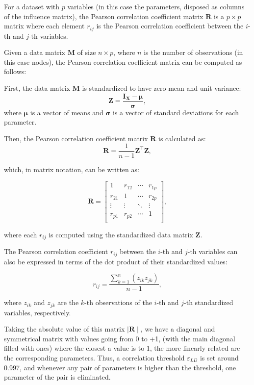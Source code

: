 For a dataset with \( p \) variables (in this case the parameters, disposed as columns of the influence matrix), the Pearson correlation coefficient matrix \( \mathbf{R} \) is a \( p \times p \) matrix where each element \( r_{ij} \) is the Pearson correlation coefficient between the \( i \)-th and \( j \)-th variables.

Given a data matrix \( \mathbf{M} \) of size \( n \times p \), where \( n \) is the number of observations (in this case nodes), the Pearson correlation coefficient matrix can be computed as follows:

First, the data matrix \( \mathbf{M} \) is standardized to have zero mean and unit variance:
   \[
   \mathbf{Z} = \frac{\boldsymbol{I_X} - \mathbf{\mu}}{\mathbf{\sigma}},
   \]
where \( \mathbf{\mu} \) is a vector of means and \( \mathbf{\sigma} \) is a vector of standard deviations for each parameter.

Then, the Pearson correlation coefficient matrix \( \mathbf{R} \) is calculated as:
   \[
   \mathbf{R} = \frac{1}{n-1} \mathbf{Z}^\top \mathbf{Z}, 
   \]

which, in matrix notation, can be written as:

\[
\mathbf{R} = \left[ \begin{array}{cccc}
1 & r_{12} & \cdots & r_{1p} \\
r_{21} & 1 & \cdots & r_{2p} \\
\vdots & \vdots & \ddots & \vdots \\
r_{p1} & r_{p2} & \cdots & 1 \\
\end{array} \right],
\]

where each \( r_{ij} \) is computed using the standardized data matrix \( \mathbf{Z} \).

The Pearson correlation coefficient \( r_{ij} \) between the \( i \)-th and \( j \)-th variables can also be expressed in terms of the dot product of their standardized values:

\[
r_{ij} = \frac{\sum_{k=1}^{n} (z_{ik} z_{jk})}{n-1},
\]

where \( z_{ik} \) and \( z_{jk} \) are the \( k \)-th observations of the \( i \)-th and \( j \)-th standardized variables, respectively.

Taking the absolute value of this matrix $\mid \mathbf{R}\mid$, we have a diagonal and symmetrical matrix with values going from 0 to +1, (with the main diagonal filled with ones) where the closest a value is to 1, the more linearly related are the corresponding parameters. Thus, a correlation threshold $\varepsilon_{LD}$ is set around 0.997, and whenever any pair of parameters is higher than the threshold, one parameter of the pair is eliminated.  

